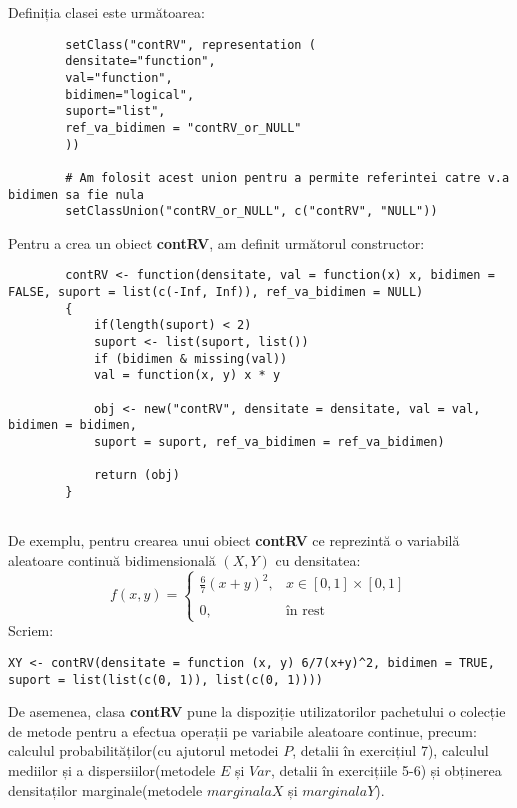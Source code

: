 \documentclass[12pt]{article}
\begin{document}
	Definiția clasei este următoarea:
	\begin{lstlisting}
		setClass("contRV", representation (
		densitate="function",
		val="function",
		bidimen="logical",
		suport="list",
		ref_va_bidimen = "contRV_or_NULL"
		))
		
		# Am folosit acest union pentru a permite referintei catre v.a bidimen sa fie nula
		setClassUnion("contRV_or_NULL", c("contRV", "NULL"))
	\end{lstlisting}\pagebreak
	
	Pentru a crea un obiect \textbf{contRV}, am definit următorul constructor:
	\begin{lstlisting}
		contRV <- function(densitate, val = function(x) x, bidimen = FALSE, suport = list(c(-Inf, Inf)), ref_va_bidimen = NULL)
		{
			if(length(suport) < 2)
			suport <- list(suport, list())
			if (bidimen & missing(val))
			val = function(x, y) x * y
			
			obj <- new("contRV", densitate = densitate, val = val, bidimen = bidimen,
			suport = suport, ref_va_bidimen = ref_va_bidimen)
			
			return (obj)
		}
		
	\end{lstlisting}

	De exemplu, pentru crearea unui obiect \textbf{contRV} ce reprezintă o variabilă aleatoare continuă bidimensională $(X, Y)$ cu densitatea:
	\[ 
	f(x, y)= \left\{
	\begin{array}{ll}
		\frac{6}{7}(x+y)^2, & x \in [0, 1] \times [0, 1] \\\\
		0,				   & \text{în rest}
	\end{array} 
	\right. 
	\]
	Scriem:
	\begin{lstlisting}[numbers=none]
		XY <- contRV(densitate = function (x, y) 6/7(x+y)^2, bidimen = TRUE, suport = list(list(c(0, 1)), list(c(0, 1))))
	\end{lstlisting}\vspace*{1\baselineskip}
	
	
	De asemenea, clasa \textbf{contRV} pune la dispoziție utilizatorilor pachetului o colecție de metode pentru a efectua operații pe variabile aleatoare continue, precum: calculul probabilităților(cu ajutorul metodei $P$, detalii în exercițiul 7), calculul mediilor și a dispersiilor(metodele $E$ și $Var$, detalii în exercițiile 5-6) și obținerea densitaților marginale(metodele $marginalaX$ și $marginalaY$).
\end{document}
